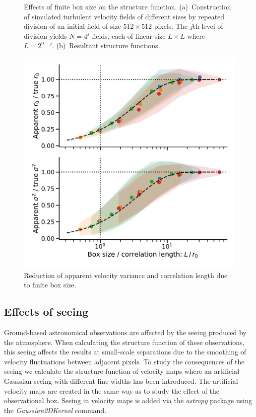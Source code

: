 \documentclass[fleqn,usenatbib, useAMS, a4paper]{mnras}
\begin{document}
\begin{figure}
\begin{tabular}{@{} l @{}}
  \end{tabular}
  \caption{Effects of finite box size on the structure function.
    (a)~Construction of simulated turbulent velocity fields of different sizes
    by repeated division of an initial field of size \(512 \times 512\) pixels.
    The \(j\)th level of division yields \(N = 4^j\) fields,
    each of linear size \(L \times L\) where \(L = 2^{9 - j}\). 
    (b)~Resultant structure functions.
  }
  \label{fig:finite-box}
\end{figure}

\begin{figure}
  \includegraphics[width=\linewidth]{Figures/fake-finite-box-effect}
  \caption{
    Reduction of apparent velocity variance and correlation length
    due to finite box size.
  }
  \label{fig:finite-box-effect}
\end{figure}



\subsection{Effects of seeing}
\label{sec:effects-seeing-struc}

Ground-based astronomical observations are affected by the seeing produced by the atmosphere.
When calculating the structure function of these observations, this seeing affects the results at small-scale separations due to the smoothing of velocity fluctuations between adjacent pixels.
To study the consequences of the seeing we calculate the structure function of velocity maps where an artificial Gaussian seeing with different line widths has been introduced.
The artificial velocity maps are created in the same way as to study the effect of the observational box.
Seeing in velocity maps is added via the \textit{astropy} package using the \textit{Gaussian2DKernel} command. 
\end{document}
